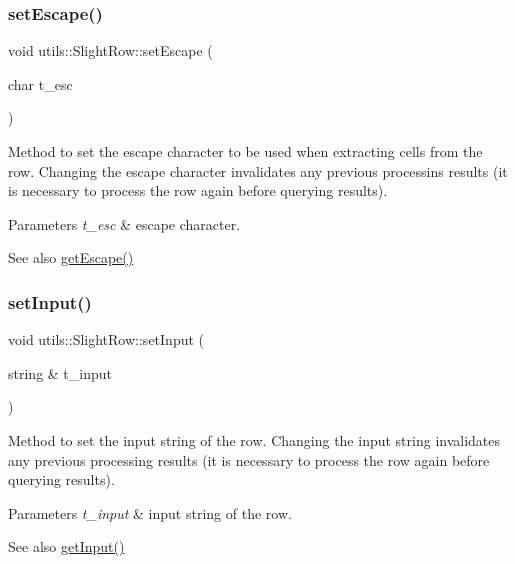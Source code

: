 \subsubsection{\texorpdfstring{set\+Escape()}{setEscape()}}
{\footnotesize\ttfamily void utils\+::\+Slight\+Row\+::set\+Escape (\begin{DoxyParamCaption}\item[{char}]{t\+\_\+esc }\end{DoxyParamCaption})}

Method to set the escape character to be used when extracting cells from the row. Changing the escape character invalidates any previous processins results (it is necessary to process the row again before querying results). 
\begin{DoxyParams}{Parameters}
{\em t\+\_\+esc} & escape character. \\
\hline
\end{DoxyParams}
\begin{DoxySeeAlso}{See also}
\hyperlink{classutils_1_1SlightRow_a75266f8f076b39135677cf54dcff986c}{get\+Escape()} 
\end{DoxySeeAlso}
\mbox{\label{classutils_1_1SlightRow_abb27b43d2dbe46d47805c05f7b87ab82}} 
\subsubsection{\texorpdfstring{set\+Input()}{setInput()}}
{\footnotesize\ttfamily void utils\+::\+Slight\+Row\+::set\+Input (\begin{DoxyParamCaption}\item[{string \&}]{t\+\_\+input }\end{DoxyParamCaption})}

Method to set the input string of the row. Changing the input string invalidates any previous processing results (it is necessary to process the row again before querying results). 
\begin{DoxyParams}{Parameters}
{\em t\+\_\+input} & input string of the row. \\
\hline
\end{DoxyParams}
\begin{DoxySeeAlso}{See also}
\hyperlink{classutils_1_1SlightRow_a8491ac21fba9e5c258e7c1a3bf3da26a}{get\+Input()} 
\end{DoxySeeAlso}
\mbox{\label{classutils_1_1SlightRow_ad26f06a994890c68fedb45ba1e95f25d}} 
